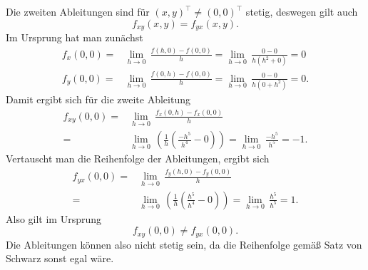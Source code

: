 {Die zweiten Ableitungen sind f\"ur  $(x,y)^\top\neq (0,0)^\top$ stetig, deswegen gilt auch 
$$f_{xy}(x,y)=f_{yx}(x,y).$$
Im Ursprung hat man zun\"achst 
\begin{align*}
f_x(0,0)=& \underset{h\to 0}\lim\, \frac{f(h,0)-f(0,0)}{h}=\underset{h\to
0}\lim\, \frac {0-0}{h(h^2+0)}=0\\
f_y(0,0)=& \underset{h\to 0}\lim\, \frac{f(0,h)-f(0,0)}{h}=\underset{h\to0}\lim\, \frac {0-0}{h(0+h^2)}=0. 
\end{align*}
Damit ergibt sich f\"ur die zweite Ableitung 
\begin{align*}
f_{xy}(0,0)=&\underset{h\to 0}\lim\, \frac{f_x(0,h)- f_x(0,0)}{h}\\
=& \underset{h\to 0}\lim\, \left( \frac{1}h \left(\frac{-h^5}{h^4} - 0\right)\right)=\underset{h\to 0}\lim\, \frac{-h^5}{h^5}=-1. 
\end{align*}
Vertauscht man die Reihenfolge der Ableitungen, ergibt sich
\begin{align*}
f_{yx}(0,0)=&\underset{h\to 0}\lim\, \frac{f_y(h,0)- f_y(0,0)}{h}\\
=& \underset{h\to 0}\lim\, \left( \frac{1}h \left( \frac{h^5}{h^4} - 0\right)\right)=\underset{h\to 0}\lim\, \frac{h^5}{h^5}=1. 
\end{align*}
Also gilt im Ursprung 
$$f_{xy}(0,0)\neq f_{yx}(0,0).$$
Die Ableitungen k\"onnen also nicht stetig sein, da die Reihenfolge gem\"a\ss{} Satz von Schwarz sonst egal w\"are. 

}

%


